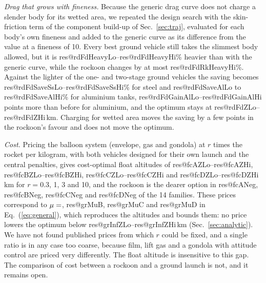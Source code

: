 \documentclass[11pt,a4paper]{article}
\makeatletter
\newcommand{\R}[1]{\csname res@#1\endcsname}
\makeatother
\begin{document}
\emph{Drag that grows with fineness.} Because the generic drag curve does not charge a slender body for its wetted area, we repeated the design search with the skin-friction term of the component build-up of Sec.~\ref{sec:traj}, evaluated for each body's own fineness and added to the generic curve as its difference from the value at a fineness of 10. Every best ground vehicle still takes the slimmest body allowed, but it is \R{rdFdHeavyLo}--\R{rdFdHeavyHi}\% heavier than with the generic curve, while the rockoon changes by at most \R{rdFdRkHeavyHi}\%. Against the lighter of the one- and two-stage ground vehicles the saving becomes \R{rdFdSaveSsLo}--\R{rdFdSaveSsHi}\% for steel and \R{rdFdSaveAlLo} to \R{rdFdSaveAlHi}\% for aluminium tanks, \R{rdFdGainAlLo}--\R{rdFdGainAlHi} points more than before for aluminium, and the optimum stays at \R{rdFdZLo}--\R{rdFdZHi}\,km. Charging for wetted area moves the saving by a few points in the rockoon's favour and does not move the optimum.

\emph{Cost.} Pricing the balloon system (envelope, gas and gondola) at $r$ times the rocket per kilogram, with both vehicles designed for their own launch and the central penalties, gives cost-optimal float altitudes of \R{fcAZLo}--\R{fcAZHi}, \R{fcBZLo}--\R{fcBZHi}, \R{fcCZLo}--\R{fcCZHi} and \R{fcDZLo}--\R{fcDZHi}\,km for $r=0.3$, 1, 3 and 10, and the rockoon is the dearer option in \R{fcANeg}, \R{fcBNeg}, \R{fcCNeg} and \R{fcDNeg} of the 14 families. These prices correspond to $\mu=\R{grMuA}$, \R{grMuB}, \R{grMuC} and \R{grMuD} in Eq.~(\ref{eq:general}), which reproduces the altitudes and bounds them: no price lowers the optimum below \R{grInfZLo}--\R{grInfZHi}\,km (Sec.~\ref{sec:analytic}). We have not found published prices from which $r$ could be fixed, and a single ratio is in any case too coarse, because film, lift gas and a gondola with attitude control are priced very differently. The float altitude is insensitive to this gap. The comparison of cost between a rockoon and a ground launch is not, and it remains open.
\end{document}
